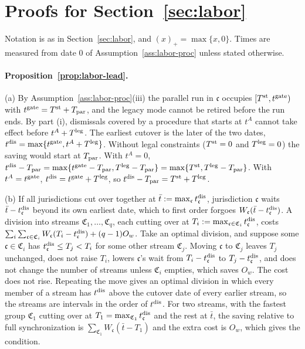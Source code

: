 \section{Proofs for Section~\ref{sec:labor}}\label{app:proofs-labor}

Notation is as in Section~\ref{sec:labor}, and $(x)_+=\max\{x,0\}$. Times are measured from date 0 of Assumption~\ref{ass:labor-proc} unless stated otherwise.

\paragraph{Proposition~\ref{prop:labor-lead}.}
(a) By Assumption~\ref{ass:labor-proc}(iii) the parallel run in $\mathfrak c$ occupies $[T^{\rm st},t^{\rm gate})$ with $t^{\rm gate}=T^{\rm st}+T_{\rm par}$, and the legacy mode cannot be retired before the run ends. By part (i), dismissals covered by a procedure that starts at $t^A$ cannot take effect before $t^A+T^{\rm leg}$. The earliest cutover is the later of the two dates, $t^{\rm dis}=\max\{t^{\rm gate},t^A+T^{\rm leg}\}$. Without legal constraints ($T^{\rm st}=0$ and $T^{\rm leg}=0$) the saving would start at $T_{\rm par}$. With $t^A=0$, $t^{\rm dis}-T_{\rm par}=\max\{t^{\rm gate}-T_{\rm par},T^{\rm leg}-T_{\rm par}\}=\max\{T^{\rm st},T^{\rm leg}-T_{\rm par}\}$. With $t^A=t^{\rm gate}$, $t^{\rm dis}=t^{\rm gate}+T^{\rm leg}$, so $t^{\rm dis}-T_{\rm par}=T^{\rm st}+T^{\rm leg}$.

(b) If all jurisdictions cut over together at $\bar t:=\max_{\mathfrak c}t^{\rm dis}_{\mathfrak c}$, jurisdiction $\mathfrak c$ waits $\bar t-t^{\rm dis}_{\mathfrak c}$ beyond its own earliest date, which to first order forgoes $W_{\mathfrak c}(\bar t-t^{\rm dis}_{\mathfrak c})$. A division into streams $\mathfrak C_1,\dots,\mathfrak C_q$, each cutting over at $T_i:=\max_{\mathfrak c\in\mathfrak C_i}t^{\rm dis}_{\mathfrak c}$, costs $\sum_i\sum_{\mathfrak c\in\mathfrak C_i}W_{\mathfrak c}(T_i-t^{\rm dis}_{\mathfrak c})+(q-1)O_w$. Take an optimal division, and suppose some $\mathfrak c\in\mathfrak C_i$ has $t^{\rm dis}_{\mathfrak c}\le T_j<T_i$ for some other stream $\mathfrak C_j$. Moving $\mathfrak c$ to $\mathfrak C_j$ leaves $T_j$ unchanged, does not raise $T_i$, lowers $\mathfrak c$'s wait from $T_i-t^{\rm dis}_{\mathfrak c}$ to $T_j-t^{\rm dis}_{\mathfrak c}$, and does not change the number of streams unless $\mathfrak C_i$ empties, which saves $O_w$. The cost does not rise. Repeating the move gives an optimal division in which every member of a stream has $t^{\rm dis}$ above the cutover date of every earlier stream, so the streams are intervals in the order of $t^{\rm dis}$. For two streams, with the fastest group $\mathfrak C_1$ cutting over at $T_1=\max_{\mathfrak C_1}t^{\rm dis}_{\mathfrak c}$ and the rest at $\bar t$, the saving relative to full synchronization is $\sum_{\mathfrak C_1}W_{\mathfrak c}(\bar t-T_1)$ and the extra cost is $O_w$, which gives the condition.

